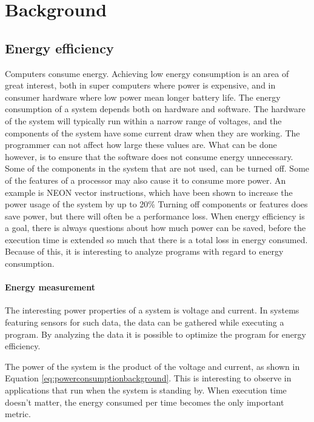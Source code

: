 \chapter[Background]{Background}

\section{Energy efficiency} \label{energymeasurement}
Computers consume energy.
Achieving low energy consumption is an area of great interest, both in super computers where power is expensive, and in consumer hardware where low power mean longer battery life.
The energy consumption of a system depends both on hardware and software.
The hardware of the system will typically run within a narrow range of voltages, and the components of the system have some current draw when they are working.
The programmer can not affect how large these values are.
What can be done however, is to ensure that the software does not consume energy unnecessary.
Some of the components in the system that are not used, can be turned off.
Some of the features of a processor may also cause it to consume more power.
An example is NEON vector instructions, which have been shown to increase the power usage of the system by up to 20\%%
Turning off components or features does save power, but there will often be a performance loss.
When energy efficiency is a goal, there is always questions about how much power can be saved, before the execution time is extended so much that there is a total loss in energy consumed.
Because of this, it is interesting to analyze programs with regard to energy consumption.

\subsubsection{Energy measurement}
The interesting power properties of a system is voltage and current.
In systems featuring sensors for such data, the data can be gathered while executing a program.
By analyzing the data it is possible to optimize the program for energy efficiency.

The power of the system is the product of the voltage and current, as shown in Equation \ref{eq:powerconsumptionbackground}.
This is interesting to observe in applications that run when the system is standing by.
When execution time doesn't matter, the energy consumed per time becomes the only important metric.

